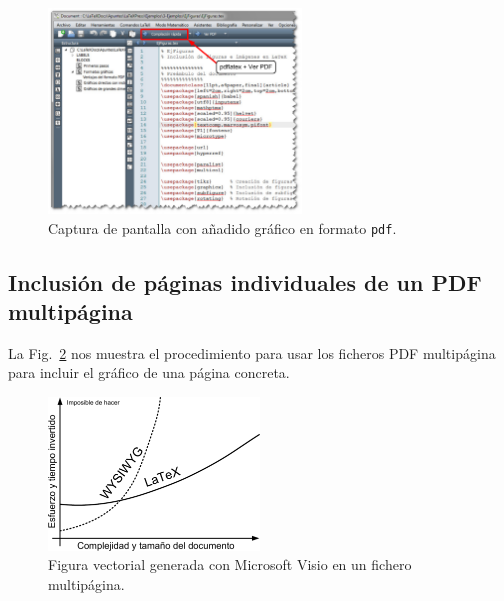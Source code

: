 \documentclass[11pt,a4paper]{article}
\begin{document}
\begin{figure}[H]
	\centering
	\includegraphics[width=0.6\textwidth]{texmk03} 
	\caption[Captura con gráfico en \texttt{pdf}]{Captura de pantalla con añadido gráfico en formato \texttt{pdf}.}
	\label{fig:texmk03}
\end{figure}











\subsection{Inclusión de páginas individuales de un \textsf{PDF} multipágina}
La Fig.~\ref{fig:visio_mp} nos muestra el procedimiento para usar los ficheros \textsf{PDF} multipágina para incluir el gráfico de una página concreta.

\begin{figure}[H]
	\centering
	\includegraphics[page=2,width=0.5\textwidth]{visio_mp} 
	\caption[Gráfico de Visio multipágina]{Figura vectorial generada con Microsoft Visio en un fichero multipágina.}
	\label{fig:visio_mp}
\end{figure}
\end{document}
